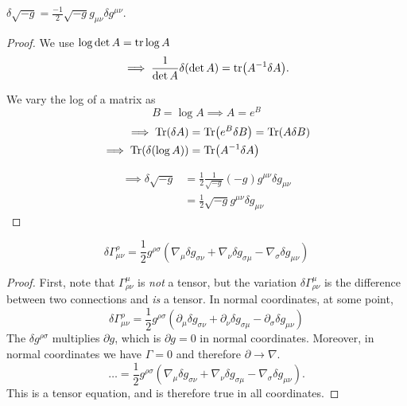 \begin{claim}
  $\delta \sqrt{-g} = \frac{-1}{2} \sqrt{-g} g_{\mu\nu} \delta g^{\mu\nu}$.
\end{claim}
\begin{proof}
  We use $\log \det A = \tr \log A$
  \begin{equation}
    \implies \frac{1}{\det A} \delta(\det A) = \tr(A^{-1} \delta A).
  \end{equation}
  \begin{leftbar}
    \begin{remark}
      We vary the log of a matrix as
      \begin{equation}
        B = \log A \implies A = e^{B}
      \end{equation}
      \begin{align}
	\implies \Tr(\delta A) &= \Tr(e^{B} \delta B) = \Tr(A \delta B) \\
	\implies \Tr (\delta (\log A)) &= \Tr(A^{-1} \delta A)
      \end{align}
    \end{remark}
  \end{leftbar}
    \begin{align}
      \implies \delta \sqrt{-g} &= \frac{1}{2} \frac{1}{\sqrt{-g}} (-g) g^{\mu\nu} \delta g_{\mu\nu} \\
				&= \frac{1}{2} \sqrt{-g} g^{\mu\nu} \delta g_{\mu\nu}
    \end{align}
\end{proof}

\begin{claim}
  \begin{equation}
  \delta \Gamma^{\rho}_{\mu\nu} = \frac{1}{2} g^{\rho\sigma} (\nabla_{\mu} \delta g_{\sigma\nu} + \nabla_{\nu} \delta g_{\sigma\mu} - \nabla_{\sigma} \delta g_{\mu\nu})
  \end{equation}
\end{claim}
\begin{proof}
  First, note that $\Gamma^{\mu}_{\rho\nu}$ is \emph{not} a tensor, but the variation $\delta \Gamma^{\mu}_{\rho\nu}$ is the difference between two connections and \emph{is} a tensor.
  In normal coordinates, at some point, 
  \begin{equation}
    \delta\Gamma^{\rho}_{\mu\nu} = \frac{1}{2} g^{\rho\sigma} (\partial_{\mu} \delta g_{\sigma\nu} + \partial_{\nu} \delta g_{\sigma\mu} - \partial_{\sigma} \delta g_{\mu\nu})
  \end{equation}
  The $\delta g^{\rho\sigma}$ multiplies $\partial g$, which is $\partial g = 0$ in normal coordinates.
  Moreover, in normal coordinates we have $\Gamma = 0$ and therefore $\partial \to \nabla$.
  \begin{equation}
    \dots = \frac{1}{2} g^{\rho\sigma} (\nabla_{\mu} \delta g_{\sigma\nu} + \nabla_{\nu} \delta g_{\sigma\mu} - \nabla_{\sigma} \delta g_{\mu\nu}).
  \end{equation}
  This is a tensor equation, and is therefore true in all coordinates.
\end{proof}

